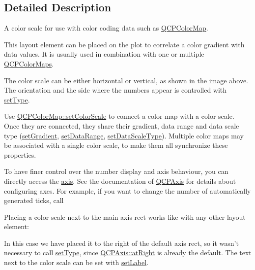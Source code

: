 \subsection{\-Detailed \-Description}
\-A color scale for use with color coding data such as \hyperlink{classQCPColorMap}{\-Q\-C\-P\-Color\-Map}. 

\-This layout element can be placed on the plot to correlate a color gradient with data values. \-It is usually used in combination with one or multiple \hyperlink{classQCPColorMap}{\-Q\-C\-P\-Color\-Maps}.



\-The color scale can be either horizontal or vertical, as shown in the image above. \-The orientation and the side where the numbers appear is controlled with \hyperlink{classQCPColorScale_a1bf9bdb291927c422dd66b404b206f1f}{set\-Type}.

\-Use \hyperlink{classQCPColorMap_aa828921db364fe3c6af4619580ab85fd}{\-Q\-C\-P\-Color\-Map\-::set\-Color\-Scale} to connect a color map with a color scale. \-Once they are connected, they share their gradient, data range and data scale type (\hyperlink{classQCPColorScale_a1f29583bb6f1e7f473b62fb712be3940}{set\-Gradient}, \hyperlink{classQCPColorScale_abe88633003a26d1e756aa74984587fef}{set\-Data\-Range}, \hyperlink{classQCPColorScale_aeb6107d67dd7325145b2498abae67fc3}{set\-Data\-Scale\-Type}). \-Multiple color maps may be associated with a single color scale, to make them all synchronize these properties.

\-To have finer control over the number display and axis behaviour, you can directly access the \hyperlink{classQCPColorScale_a1205bd67c8a33d5818aac1f6eea016a4}{axis}. \-See the documentation of \hyperlink{classQCPAxis}{\-Q\-C\-P\-Axis} for details about configuring axes. \-For example, if you want to change the number of automatically generated ticks, call 
\begin{DoxyCodeInclude}
\end{DoxyCodeInclude}
 \-Placing a color scale next to the main axis rect works like with any other layout element\-: 
\begin{DoxyCodeInclude}
\end{DoxyCodeInclude}
 \-In this case we have placed it to the right of the default axis rect, so it wasn't necessary to call \hyperlink{classQCPColorScale_a1bf9bdb291927c422dd66b404b206f1f}{set\-Type}, since \hyperlink{classQCPAxis_ae2bcc1728b382f10f064612b368bc18aadf5509f7d29199ef2f263b1dd224b345}{\-Q\-C\-P\-Axis\-::at\-Right} is already the default. \-The text next to the color scale can be set with \hyperlink{classQCPColorScale_aee124ae8396320cacf8276e9a0fbb8ce}{set\-Label}.

